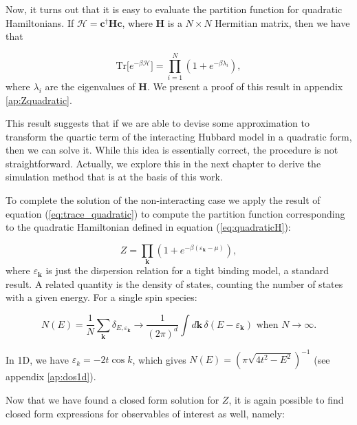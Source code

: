 Now, it turns out that it is easy to evaluate the partition function for quadratic Hamiltonians. If $\mathcal{H} = \bm c^\dagger \bm H \bm c$, where $\bm H$ is a $N \times N$ Hermitian matrix, then we have that

\begin{equation}\label{eq:trace_quadratic}
\text{Tr} \big[ e^{-\beta \mathcal{H} } \big] = \prod_{i=1}^N ( 1 + e^{-\beta \lambda_i } ) ,
\end{equation}
where $\lambda_i$ are the eigenvalues of $\bm H$. We present a proof of this result in appendix \ref{ap:Zquadratic}.

This result suggests that if we are able to devise some approximation to transform the quartic term of the interacting Hubbard model in a quadratic form, then we can solve it.
While this idea is essentially correct, the procedure is not straightforward.
Actually, we explore this in the next chapter to derive the simulation method that is at the basis of this work.

To complete the solution of the non-interacting case we apply the result of equation (\ref{eq:trace_quadratic}) to compute the partition function corresponding to the quadratic Hamiltonian defined in equation (\ref{eq:quadraticH}):

\begin{equation}
Z = \prod_{\bm k} ( 1 + e^{-\beta (\varepsilon_{\bm k} - \mu )} ) ,
\end{equation}
where $\varepsilon_{\bm k}$ is just the dispersion relation for a tight binding model, a standard result.
A related quantity is the density of states, counting the number of states with a given energy. For a single spin species:

\begin{equation}
N ( E ) = \frac{1}{N} \sum_{\bm k} \delta_{E,\varepsilon_{\bm k}} \rightarrow \frac{1}{(2\pi)^d} \int d\bm k \, \delta ( E - \varepsilon_{\bm k})\,\, \text{when}\,\, N\rightarrow \infty.
\end{equation}

In \acs{1D}, we have $\varepsilon_{k} = - 2 t \cos k$, which gives $N(E) = ( \pi \sqrt{ 4 t^2 - E^2 } )^{-1}$ (see appendix \ref{ap:dos1d}).

Now that we have found a closed form solution for $Z$, it is again possible to find closed form expressions for observables of interest as well, namely:


